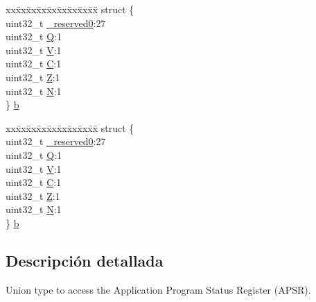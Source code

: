 \begin{DoxyCompactItemize}
\begin{tabbing}
\end{tabbing}\item 
\begin{tabbing}
xx\=xx\=xx\=xx\=xx\=xx\=xx\=xx\=xx\=\kill
struct \{\\
\>uint32\_t \hyperlink{union_a_p_s_r___type_ac8a6a13838a897c8d0b8bc991bbaf7c1}{\_reserved0}:27\\
\>uint32\_t \hyperlink{union_a_p_s_r___type_a65f27ddc4f7e09c14ce7c5211b2e000a}{Q}:1\\
\>uint32\_t \hyperlink{union_a_p_s_r___type_acd4a2b64faee91e4a9eef300667fa222}{V}:1\\
\>uint32\_t \hyperlink{union_a_p_s_r___type_a7a1caf92f32fe9ebd8d1fe89b06c7776}{C}:1\\
\>uint32\_t \hyperlink{union_a_p_s_r___type_a5ae954cbd9986cd64625d7fa00943c8e}{Z}:1\\
\>uint32\_t \hyperlink{union_a_p_s_r___type_abae0610bc2a97bbf7f689e953e0b451f}{N}:1\\
\} \hyperlink{union_a_p_s_r___type_ac32e0a1e915bb0b893bb7ebd4af5fa78}{b}\\

\end{tabbing}\item 
\begin{tabbing}
xx\=xx\=xx\=xx\=xx\=xx\=xx\=xx\=xx\=\kill
struct \{\\
\>uint32\_t \hyperlink{union_a_p_s_r___type_ac8a6a13838a897c8d0b8bc991bbaf7c1}{\_reserved0}:27\\
\>uint32\_t \hyperlink{union_a_p_s_r___type_a65f27ddc4f7e09c14ce7c5211b2e000a}{Q}:1\\
\>uint32\_t \hyperlink{union_a_p_s_r___type_acd4a2b64faee91e4a9eef300667fa222}{V}:1\\
\>uint32\_t \hyperlink{union_a_p_s_r___type_a7a1caf92f32fe9ebd8d1fe89b06c7776}{C}:1\\
\>uint32\_t \hyperlink{union_a_p_s_r___type_a5ae954cbd9986cd64625d7fa00943c8e}{Z}:1\\
\>uint32\_t \hyperlink{union_a_p_s_r___type_abae0610bc2a97bbf7f689e953e0b451f}{N}:1\\
\} \hyperlink{union_a_p_s_r___type_a632485d6ce69e15be1e9c35db79619cf}{b}\\

\end{tabbing}\end{DoxyCompactItemize}


\subsection{Descripción detallada}
Union type to access the Application Program Status Register (A\+P\+SR). 

